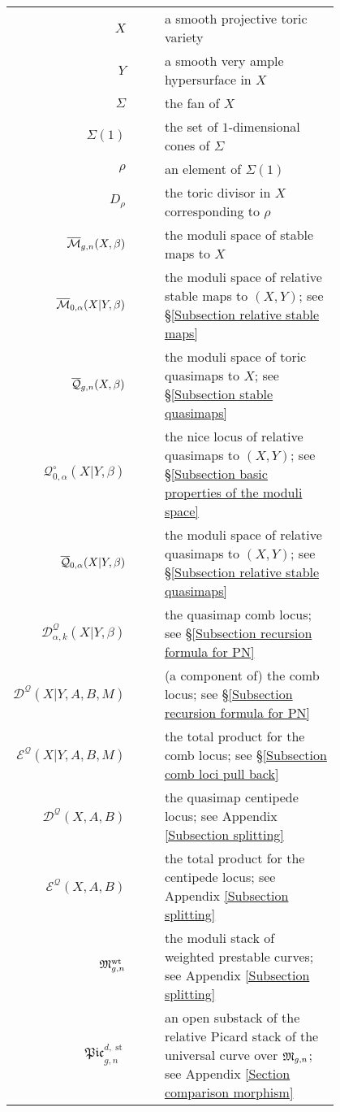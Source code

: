 \begin{longtabu}{r c c p{0.8\linewidth}}
$X$ & & & a smooth projective toric variety \\
$Y$ & & & a smooth very ample hypersurface in $X$ \\
$\Sigma$ & & & the fan of $X$ \\
$\Sigma(1)$ & & & the set of $1$-dimensional cones of $\Sigma$ \\
$\rho$ & & & an element of $\Sigma(1)$ \\
$D_\rho$ & & & the toric divisor in $X$ corresponding to $\rho$ \\
$\overline{\mathcal M}_{g,n}(X,\beta)$ & & & the moduli space of stable maps to $X$ \\
$\overline{\mathcal M}_{0,\alpha}(X|Y,\beta)$ & & & the moduli space of relative stable maps to $(X,Y)$; see \S \ref{Subsection relative stable maps} \\
$\overline{\mathcal Q}_{g,n}(X,\beta)$ & & & the moduli space of toric quasimaps to $X$; see \S \ref{Subsection stable quasimaps} \\
$\mathcal{Q}^{\circ}_{0,\alpha}(X|Y,\beta)$ & & & the nice locus of relative quasimaps to $(X,Y)$; see \S \ref{Subsection basic properties of the moduli space} \\
$\overline{\mathcal Q}_{0,\alpha}(X|Y,\beta)$ & & & the moduli space of relative quasimaps to $(X,Y)$; see \S \ref{Subsection relative stable quasimaps} \\
$\mathcal{D}^{\mathcal{Q}}_{\alpha,k}(X|Y,\beta)$ & & & the quasimap comb locus; see \S \ref{Subsection recursion formula for PN} \\
$\mathcal{D}^{\mathcal{Q}}(X|Y,A,B,M)$ & & & (a component of) the comb locus; see \S \ref{Subsection recursion formula for PN} \\
$\mathcal{E}^{\mathcal{Q}}(X|Y,A,B,M)$ & & & the total product for the comb locus; see \S \ref{Subsection comb loci pull back} \\
$\mathcal{D}^{\mathcal{Q}}(X,A,B)$ & & & the quasimap centipede locus; see Appendix \ref{Subsection splitting} \\
$\mathcal{E}^{\mathcal{Q}}(X,A,B)$ & & & the total product for the centipede locus; see Appendix \ref{Subsection splitting} \\
$\mathfrak M^{\operatorname{wt}}_{g,n}$ & & & the moduli stack of weighted prestable curves; see Appendix \ref{Subsection splitting} \\
$\mathfrak{Pic}_{g,n}^{d,\operatorname{st}}$ & & & an open substack of the relative Picard stack of the universal curve over $\mathfrak M_{g,n}$; see Appendix  \ref{Section comparison morphism} \\

\end{longtabu}
